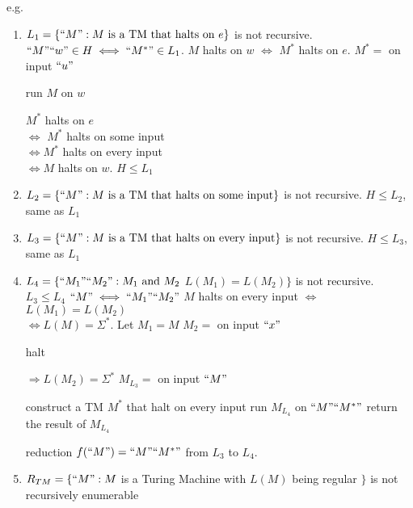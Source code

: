 e.g. 
\begin{enumerate}
    \item $L_1=\{ ``M": M \text{ is a TM that halts on }e \}$ is not recursive. 
    \subitem $``M"``w"\in H \iff ``{M^*} "\in L_1$. 
    \subitem $M$ halts on $w$ $\iff$ $M^*$ halts on $e$. 
    \subitem $M^*=$ on input $``u"$
    \begin{algorithm}[H]
        \caption{$M^*$}
        \begin{algorithmic}
            \State run $M$ on $w$
        \end{algorithmic}
    \end{algorithm}
    $M^*$ halts on $e$\\
    $\iff$ $M^*$ halts on some input\\
    $\iff M^*$ halts on every input\\
    $\iff M$ halts on $w$. 
    \subitem $H\le L_1$
    \item $L_2=\{ ``M": M \text{ is a TM that halts on some input} \}$ is not recursive. 
    \subitem $H\le L_2$, same as $L_1$
    \item $L_3=\{ ``M": M\text{ is a TM that halts on every input} \}$ is not recursive. 
    \subitem $H\le L_3$, same as $L_1$
    \item $L_4=\{ ``M_1"``M_2": M_1 \text{ and } M_2$  $L(M_1)=L(M_2) \}$ is not recursive. 
    \subitem $L_3\le L_4$
    \subitem $``M"\iff ``M_1"``M_2"$
    \subitem $M$ halts on every input $\iff$ $L(M_1)=L(M_2)$\\
    $\iff L(M)=\Sigma^*$. 
    \subitem Let $M_1=M$
    \subitem $M_2=$ on input $``x"$
    \begin{algorithm}[H]
        \caption{$M_2$}
        \begin{algorithmic}
            \State halt
        \end{algorithmic}
    \end{algorithm}
    $\Rightarrow L(M_2)=\Sigma^*$
    \subitem $M_{L_3}=$ on input $``M"$
    \begin{algorithm}[H]
        \caption{$M_{L_3}$}
        \begin{algorithmic}
            \State construct a TM $M^*$ that halt on every input
            \State run $M_{L_4}$ on $``M"``M^*"$
            \State return the result of $M_{L_4}$
        \end{algorithmic}
    \end{algorithm}
    reduction $f(``M")= ``M"``M^*"$ from $L_3$ to $L_4$. 
    \item $R_{TM}=\{ ``M": M$  is a Turing Machine with $L(M)$ being regular $\}$ is not recursively enumerable

\end{enumerate}

